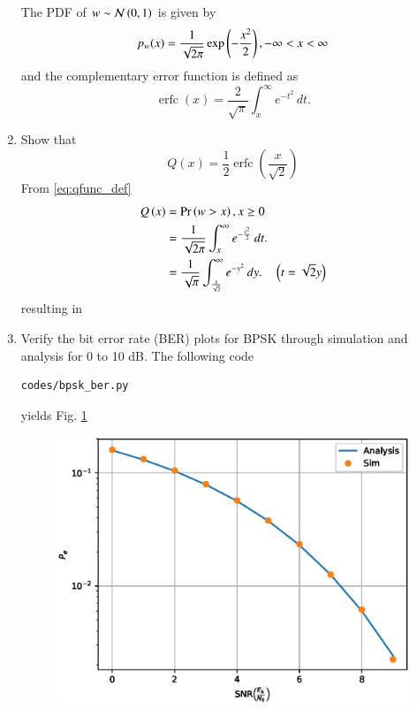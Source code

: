 \documentclass[journal,12pt,twocolumn]{IEEEtran}
\renewcommand\thesection{\arabic{section}}
\begin{document}
\begin{enumerate}[label=\thesection.\arabic*.,ref=\thesection.\theenumi]
The PDF of $w \sim \mathcal{N}\left(0,1\right)$ is given by
%
\begin{equation}
p_{w}(x) = \frac{1}{\sqrt{2\pi}}\exp\left(-\frac{x^2}{2}\right), -\infty < x < \infty
\end{equation}
and the complementary error function is defined as
\begin{equation}
\operatorname {erfc} (x)={\frac {2}{\sqrt {\pi }}}\int _{x}^{\infty }e^{-t^{2}}\,dt.
\label{eq:erfc}
\end{equation}
%
\item
Show that 
\begin{equation}
Q(x) = \frac{1}{2}\operatorname {erfc}\left({\frac  {x}{{\sqrt  {2}}}}\right)
\label{eq:qerfc}
\end{equation}
\solution From \eqref{eq:qfunc_def}
\begin{align}
Q\left(x\right)& = \Pr\left(w > x\right), x \ge 0 
\\
&= \frac {1}{\sqrt {2\pi }}\int _{x}^{\infty }e^{-\frac{t^{2}}{2}}\,dt.
\\
&= \frac {1}{\sqrt {\pi }}\int _{\frac{x}{\sqrt{2}}}^{\infty }e^{-y^{2}}\,dy. \quad \left(t = \sqrt{2}y\right)
\end{align}
%
resulting in \label{eq:qerfc}

\item
Verify the bit error rate (BER) plots for BPSK through simulation and analysis for 0 to 10 dB.
\solution
The following code
\begin{lstlisting}
codes/bpsk_ber.py
\end{lstlisting}
yields Fig. \ref{fig:bpsk_ber}
\begin{figure}[!h]
\centering
\includegraphics[width=\columnwidth]{./figs/bpsk_ber.eps}
\caption{}
\label{fig:bpsk_ber}
\end{figure}


\end{enumerate}
\end{document}
